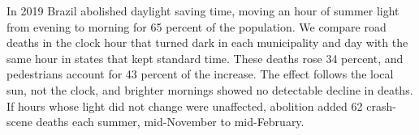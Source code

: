 In 2019 Brazil abolished daylight saving time, moving an hour of summer light from evening to morning for 65 percent of the population. We compare road deaths in the clock hour that turned dark in each municipality and day with the same hour in states that kept standard time. These deaths rose 34 percent, and pedestrians account for 43 percent of the increase. The effect follows the local sun, not the clock, and brighter mornings showed no detectable decline in deaths. If hours whose light did not change were unaffected, abolition added 62 crash-scene deaths each summer, mid-November to mid-February.
